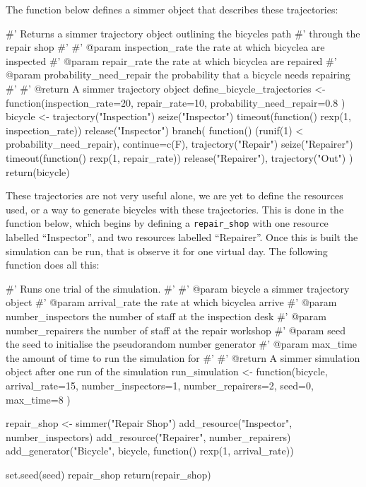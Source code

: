 
The function below defines a simmer object that describes these trajectories:

\begin{Rin}
#' Returns a simmer trajectory object outlining the bicycles path
#' through the repair shop
#'
#' @param inspection_rate the rate at which bicyclea are inspected
#' @param repair_rate the rate at which bicyclea are repaired
#' @param probability_need_repair the probability that a bicycle needs repairing
#'
#' @return A simmer trajectory object
define_bicycle_trajectories <- function(inspection_rate=20,
                                        repair_rate=10,
                                        probability_need_repair=0.8
) {
    bicycle <-
    trajectory("Inspection") %
    seize("Inspector") %
    timeout(function() {rexp(1, inspection_rate)}) %
    release("Inspector") %
    branch(
      function() (runif(1) < probability_need_repair), continue=c(F),
      trajectory("Repair") %
        seize("Repairer") %
        timeout(function() {rexp(1, repair_rate)}) %
        release("Repairer"),
      trajectory("Out")
    )
    return(bicycle)
}
\end{Rin}

These trajectories are not very useful alone, we are yet to define the resources
used, or a way to generate bicycles with these trajectories. This is done in the
function below, which begins by defining a \texttt{repair_shop} with one
resource labelled ``Inspector'', and two resources labelled ``Repairer''.
Once this is built the simulation can be run, that is observe it for one
virtual day. The following function does all this:

\begin{Rin}
#' Runs one trial of the simulation.
#'
#' @param bicycle a simmer trajectory object
#' @param arrival_rate the rate at which bicyclea arrive
#' @param number_inspectors the number of staff at the inspection desk
#' @param number_repairers the number of staff at the repair workshop
#' @param seed the seed to initialise the pseudorandom number generator
#' @param max_time the amount of time to run the simulation for
#'
#' @return A simmer simulation object after one run of the simulation
run_simulation <- function(bicycle,
                           arrival_rate=15,
                           number_inspectors=1,
                           number_repairers=2,
                           seed=0,
                           max_time=8
) {
  repair_shop <-
    simmer("Repair Shop") %
    add_resource("Inspector", number_inspectors) %
    add_resource("Repairer", number_repairers) %
    add_generator("Bicycle", bicycle, function() {rexp(1, arrival_rate)})

  set.seed(seed)
  repair_shop %
  return(repair_shop)
}
\end{Rin}

